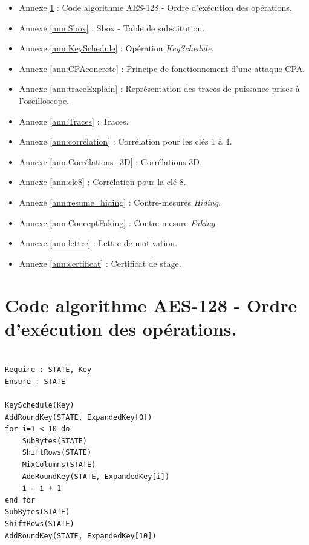 \documentclass[10pt, oneside, a4paper]{article}
\begin{document}
\begin{itemize}
\item Annexe \ref{ann:AES} : Code algorithme AES-128 - Ordre d'exécution des opérations.
\item Annexe \ref{ann:Sbox} : Sbox - Table de substitution.
\item Annexe \ref{ann:KeySchedule} : Opération \textit{KeySchedule}.
\item Annexe \ref{ann:CPAconcrete} : Principe de fonctionnement d'une attaque CPA.
\item Annexe \ref{ann:traceExplain} : Représentation des traces de puissance prises à l'oscilloscope.
\item Annexe \ref{ann:Traces} : Traces.
\item Annexe \ref{ann:corrélation} : Corrélation pour les clés 1 à 4.
\item Annexe \ref{ann:Corrélations_3D} : Corrélations 3D.
\item Annexe \ref{ann:cle8} : Corrélation pour la clé 8.
\item Annexe \ref{ann:resume_hiding} : Contre-mesures \textit{Hiding}.
\item Annexe \ref{ann:ConceptFaking} : Contre-mesure \textit{Faking}.
\item Annexe \ref{ann:lettre} : Lettre de motivation.
\item Annexe \ref{ann:certificat} : Certificat de stage.
\end{itemize}

\lhead{}

\newpage

\section{Code algorithme AES-128 - Ordre d'exécution des opérations.}
\label{ann:AES}
\lstset{language=Pascal}          %
\begin{lstlisting}[frame=single]  % Start your code-block

Require : STATE, Key
Ensure : STATE

KeySchedule(Key)
AddRoundKey(STATE, ExpandedKey[0])
for i=1 < 10 do
	SubBytes(STATE)
	ShiftRows(STATE)
	MixColumns(STATE)
	AddRoundKey(STATE, ExpandedKey[i])
	i = i + 1
end for
SubBytes(STATE)
ShiftRows(STATE)
AddRoundKey(STATE, ExpandedKey[10])
\end{lstlisting}
\end{document}
